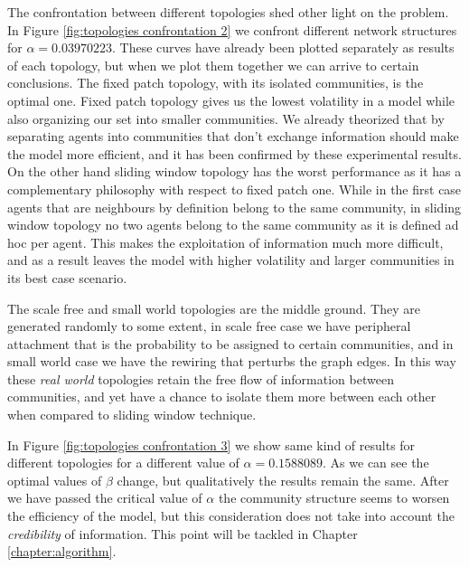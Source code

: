 The confrontation between different topologies shed other light on the problem.
In Figure \ref{fig:topologies confrontation 2} we confront different network structures for $\alpha=0.03970223$.
These curves have already been plotted separately as results of each topology, but when we plot them together we can arrive to certain conclusions.
The fixed patch topology, with its isolated communities, is the optimal one.
Fixed patch topology gives us the lowest volatility in a model while also organizing our set into smaller communities.
We already theorized that by separating agents into communities that don't exchange information should make the model more efficient, and it has been confirmed by these experimental results.
On the other hand sliding window topology has the worst performance as it has a complementary philosophy with respect to fixed patch one.
While in the first case agents that are neighbours by definition belong to the same community, in sliding window topology no two agents belong to the same community as it is defined ad hoc per agent.
This makes the exploitation of information much more difficult, and as a result leaves the model with higher volatility and larger communities in its best case scenario.

The scale free and small world topologies are the middle ground.
They are generated randomly to some extent, in scale free case we have peripheral attachment that is the probability to be assigned to certain communities, and in small world case we have the rewiring that perturbs the graph edges.
In this way these \textit{real world} topologies retain the free flow of information between communities, and yet have a chance to isolate them more between each other when compared to sliding window technique.

In Figure \ref{fig:topologies confrontation 3} we show same kind of results for different topologies for a different value of $\alpha=0.1588089$.
As we can see the optimal values of $\beta$ change, but qualitatively the results remain the same.
After we have passed the critical value of $\alpha$ the community structure seems to worsen the efficiency of the model, but this consideration does not take into account the \textit{credibility} of information.
This point will be tackled in Chapter \ref{chapter:algorithm}.

